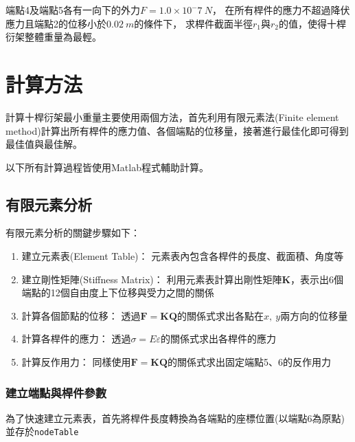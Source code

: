 \documentclass[12pt,a4paper]{article}
\begin{document}
    端點4及端點5各有一向下的外力$F = 1.0\times10^-7\ N$，
    在所有桿件的應力不超過降伏應力且端點2的位移小於$0.02\ m$的條件下，
    求桿件截面半徑$r_1$與$r_2$的值，使得十桿衍架整體重量為最輕。
    
\newpage

\section{計算方法}
    
    計算十桿衍架最小重量主要使用兩個方法，首先利用有限元素法(Finite element method)計算出所有桿件的應力值、各個端點的位移量，接著進行最佳化即可得到最佳值與最佳解。
    
    以下所有計算過程皆使用Matlab程式輔助計算。
    
    \subsection{有限元素分析}
        
        有限元素分析的關鍵步驟如下：
        \begin{enumerate}
            \item 建立元素表(Element Table)：
                  元素表內包含各桿件的長度、截面積、角度等
            \item 建立剛性矩陣(Stiffness Matrix)：
                  利用元素表計算出剛性矩陣$\mathbf{K}$，表示出6個端點的12個自由度上下位移與受力之間的關係
            \item 計算各個節點的位移：
                  透過$\mathbf{F} = \mathbf{K}\mathbf{Q}$的關係式求出各點在$x,\ y$兩方向的位移量
            \item 計算各桿件的應力：
                  透過$\sigma=E\varepsilon$的關係式求出各桿件的應力
            \item 計算反作用力：
                  同樣使用$\mathbf{F} = \mathbf{K}\mathbf{Q}$的關係式求出固定端點5、6的反作用力
        \end{enumerate}
        
        \newpage

        \subsubsection{建立端點與桿件參數}
        
            為了快速建立元素表，首先將桿件長度轉換為各端點的座標位置(以端點6為原點)並存於\texttt{nodeTable}
            
            
\end{document}
